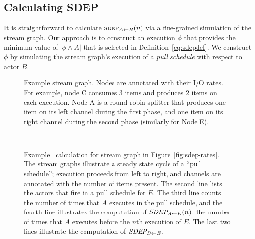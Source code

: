 \subsection*{Calculating SDEP}

It is straightforward to calculate $\textsc{sdep}_{A \small{\leftarrow} B}(n)$ via a
fine-grained simulation of the stream graph.  Our approach is to
construct an execution $\phi$ that provides the minimum value of
$|\phi \wedge A|$ that is selected in Definition~\ref{eq:sdepdef}.  We
construct $\phi$ by simulating the stream graph's execution of a {\it
pull schedule} with respect to actor $B$.

\begin{figure}[t!]
\begin{center}
\vspace{-12pt}
\vspace{-6pt}
\caption[Example stream graph for calculation of stream dependence
  function]{Example stream graph.  Nodes are annotated with their I/O
  rates.  For example, node C consumes 3 items and produces 2 items on
  each execution.  Node A is a round-robin splitter that produces one
  item on its left channel during the first phase, and one item on its
  right channel during the second phase (similarly for Node E).
  \protect\label{fig:sdep-rates}}

~ \\ \vspace{6pt}
\vspace{-4pt}
\caption[Example calculation of stream dependence function]{Example \figsdep\ calculation
  for stream graph in Figure~\ref{fig:sdep-rates}.  The stream graphs
  illustrate a steady state cycle of a ``pull schedule''; execution
  proceeds from left to right, and channels are annotated with the
  number of items present.  The second line lists the actors that fire
  in a pull schedule for $E$.  The third line counts the number of
  times that $A$ executes in the pull schedule, and the fourth line
  illustrates the computation of $\mbox{\it SDEP}_{A \small{\leftarrow} E}(n)$: the number of
  times that $A$ executes before the $n$th execution of $E$.  The last
  two lines illustrate the computation of $\mbox{\it SDEP}_{B \small{\leftarrow} E}$.
  \protect\label{fig:sdep1}}
\end{center}
\vspace{-26pt}
\end{figure}

